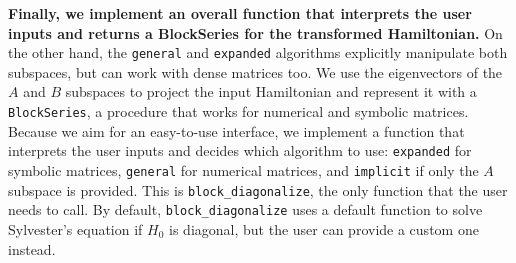\textbf{Finally, we implement an overall function that interprets the user inputs and
returns a BlockSeries for the transformed Hamiltonian.}
On the other hand, the \texttt{general} and \texttt{expanded} algorithms explicitly
manipulate both subspaces, but can work with dense matrices too.
We use the eigenvectors of the $A$ and $B$ subspaces to project the input
Hamiltonian and represent it with a \texttt{BlockSeries}, a procedure that works for
numerical and symbolic matrices.
Because we aim for an easy-to-use interface, we implement a function that
interprets the user inputs and decides which algorithm to use: \texttt{expanded}
for symbolic matrices, \texttt{general} for numerical matrices, and \texttt{implicit} if
only the $A$ subspace is provided.
This is \texttt{block\_diagonalize}, the only function that the user needs to call.
By default, \texttt{block\_diagonalize} uses a default function to solve Sylvester's
equation if $H_0$ is diagonal, but the user can provide a custom one instead.
